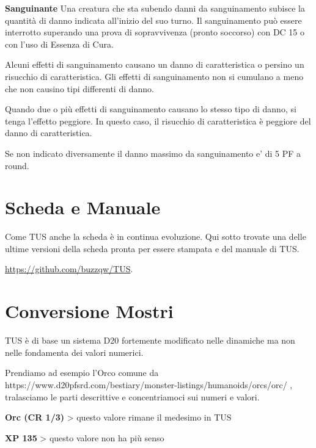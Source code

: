 \documentclass[a4paper,11pt,twoside,openany]{book}
\begin{document}
\textbf{Sanguinante} Una creatura che sta subendo danni da sanguinamento subisce la quantità di danno indicata all'inizio del suo turno. Il sanguinamento può essere interrotto superando una prova di sopravvivenza (pronto soccorso) con DC 15 o con l'uso di Essenza di Cura.

Alcuni effetti di sanguinamento causano un danno di caratteristica o persino un risucchio di caratteristica. Gli effetti di sanguinamento non si cumulano a meno che non causino tipi differenti di danno.

Quando due o più effetti di sanguinamento causano lo stesso tipo di danno, si tenga l'effetto peggiore. In questo caso, il risucchio di caratteristica è peggiore del danno di caratteristica.

Se non indicato diversamente il danno massimo da sanguinamento e' di 5 PF a round.

\pagebreak

\section{Scheda e Manuale}

\label{scheda-e-manuale}

Come TUS anche la scheda è in continua evoluzione. Qui sotto trovate una delle ultime versioni della scheda pronta per essere stampata e del manuale di TUS.

\url{https://github.com/buzzqw/TUS}.





\pagebreak

\section*{Conversione Mostri}

\bigskip

TUS è di base un sistema D20 fortemente modificato nelle dinamiche ma non nelle fondamenta dei valori numerici.

Prendiamo ad esempio l'Orco comune da https://www.d20pfsrd.com/bestiary/monster-listings/humanoids/orcs/orc/ , tralasciamo le parti descrittive e concentriamoci sui numeri e valori.

\bigskip

\textbf{Orc (CR 1/3)} \textgreater{} questo valore rimane il medesimo in TUS

\textbf{XP 135} \textgreater{} questo valore non ha più senso
\end{document}
